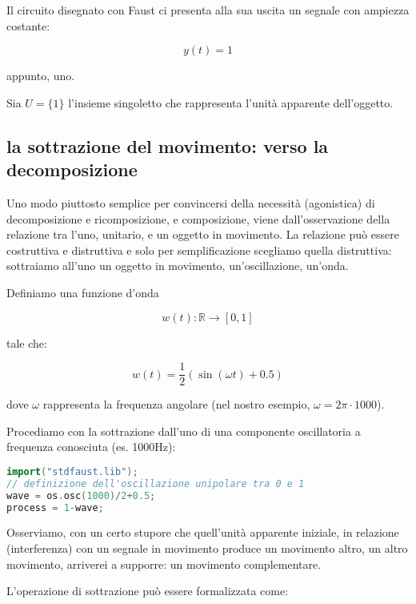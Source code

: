 \documentclass[a4paper,11pt]{article}
\begin{document}
Il circuito disegnato con Faust ci presenta alla sua uscita un segnale
con ampiezza costante:

\begin{equation}
y(t)=1
\end{equation}


appunto, uno.

Sia $U = \{1\}$ l'insieme singoletto che rappresenta l'unità apparente dell'oggetto.

\subsection{la sottrazione del movimento: verso la decomposizione}

Uno modo piuttosto semplice per convincersi della necessità (agonistica)
di decomposizione e ricomposizione, e composizione, viene
dall'osservazione della relazione tra l'uno, unitario, e un oggetto in
movimento. La relazione può essere costruttiva e distruttiva e solo per
semplificazione scegliamo quella distruttiva: sottraiamo all'uno
un oggetto in movimento, un'oscillazione, un'onda.

Definiamo una funzione d'onda

\begin{equation}
w(t): \mathbb{R} \to [0,1]
\end{equation}


tale che:

\begin{equation}
w(t) = \frac{1}{2}(\sin(\omega t) + 0.5)
\end{equation}


dove $\omega$ rappresenta la frequenza angolare (nel nostro esempio, $\omega = 2\pi \cdot 1000$).

Procediamo con la sottrazione dall'uno di una componente oscillatoria a
frequenza conosciuta (es. 1000Hz):

\begin{lstlisting}[language=c++]
import("stdfaust.lib");
// definizione dell'oscillazione unipolare tra 0 e 1
wave = os.osc(1000)/2+0.5;
process = 1-wave;
\end{lstlisting}

Osserviamo, con un certo stupore che quell'unità apparente iniziale,
in relazione (interferenza) con un segnale in movimento produce un
movimento altro, un altro movimento, arriverei a supporre:
un movimento complementare.

L'operazione di sottrazione può essere formalizzata come:
\end{document}
